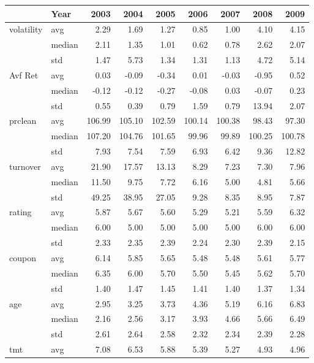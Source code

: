 \begin{tabular}{llrrrrrrr}
\toprule
 & Year & 2003 & 2004 & 2005 & 2006 & 2007 & 2008 & 2009 \\
\midrule
\multirow[t]{3}{*}{volatility} & avg & 2.29 & 1.69 & 1.27 & 0.85 & 1.00 & 4.10 & 4.15 \\
 & median & 2.11 & 1.35 & 1.01 & 0.62 & 0.78 & 2.62 & 2.07 \\
 & std & 1.47 & 5.73 & 1.34 & 1.31 & 1.13 & 4.72 & 5.14 \\
\cline{1-9}
\multirow[t]{3}{*}{Avf Ret} & avg & 0.03 & -0.09 & -0.34 & 0.01 & -0.03 & -0.95 & 0.52 \\
 & median & -0.12 & -0.12 & -0.27 & -0.08 & 0.03 & -0.07 & 0.23 \\
 & std & 0.55 & 0.39 & 0.79 & 1.59 & 0.79 & 13.94 & 2.07 \\
\cline{1-9}
\multirow[t]{3}{*}{prclean} & avg & 106.99 & 105.10 & 102.59 & 100.14 & 100.38 & 98.43 & 97.30 \\
 & median & 107.20 & 104.76 & 101.65 & 99.96 & 99.89 & 100.25 & 100.78 \\
 & std & 7.93 & 7.54 & 7.59 & 6.93 & 6.42 & 9.36 & 12.82 \\
\cline{1-9}
\multirow[t]{3}{*}{turnover} & avg & 21.90 & 17.57 & 13.13 & 8.29 & 7.23 & 7.30 & 7.96 \\
 & median & 11.50 & 9.75 & 7.72 & 6.16 & 5.00 & 4.81 & 5.66 \\
 & std & 49.25 & 38.95 & 27.05 & 9.28 & 8.35 & 8.95 & 7.87 \\
\cline{1-9}
\multirow[t]{3}{*}{rating} & avg & 5.87 & 5.67 & 5.60 & 5.29 & 5.21 & 5.59 & 6.32 \\
 & median & 6.00 & 5.00 & 5.00 & 5.00 & 5.00 & 6.00 & 6.00 \\
 & std & 2.33 & 2.35 & 2.39 & 2.24 & 2.30 & 2.39 & 2.15 \\
\cline{1-9}
\multirow[t]{3}{*}{coupon} & avg & 6.14 & 5.85 & 5.65 & 5.48 & 5.48 & 5.61 & 5.77 \\
 & median & 6.35 & 6.00 & 5.70 & 5.50 & 5.45 & 5.62 & 5.70 \\
 & std & 1.40 & 1.47 & 1.45 & 1.41 & 1.40 & 1.37 & 1.34 \\
\cline{1-9}
\multirow[t]{3}{*}{age} & avg & 2.95 & 3.25 & 3.73 & 4.36 & 5.19 & 6.16 & 6.83 \\
 & median & 2.16 & 2.56 & 3.17 & 3.93 & 4.66 & 5.66 & 6.49 \\
 & std & 2.61 & 2.64 & 2.58 & 2.32 & 2.34 & 2.39 & 2.28 \\
\cline{1-9}
\multirow[t]{3}{*}{tmt} & avg & 7.08 & 6.53 & 5.88 & 5.39 & 5.27 & 4.93 & 4.96 \\

\end{tabular}

